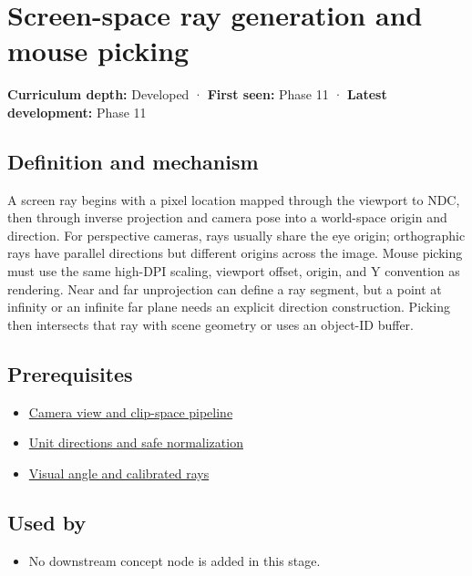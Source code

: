 \hypertarget{appendix-f1a6d43e80d1}{}\label{referencestart:appendix-f1a6d43e80d1}
\section{Screen-space ray generation and mouse picking}\label{appendix-f1a6d43e80d1-screen-space-ray-generation-and-mouse-picking}

\textbf{Curriculum depth:} Developed · \textbf{First seen:} Phase 11 · \textbf{Latest development:} Phase 11

\subsection{Definition and mechanism}\label{appendix-f1a6d43e80d1-definition-and-mechanism}

A screen ray begins with a pixel location mapped through the viewport to NDC, then through inverse projection and camera pose into a world-space origin and direction. For perspective cameras, rays usually share the eye origin; orthographic rays have parallel directions but different origins across the image. Mouse picking must use the same high-DPI scaling, viewport offset, origin, and Y convention as rendering. Near and far unprojection can define a ray segment, but a point at infinity or an infinite far plane needs an explicit direction construction. Picking then intersects that ray with scene geometry or uses an object-ID buffer.

\subsection{Prerequisites}\label{appendix-f1a6d43e80d1-prerequisites}

\begin{itemize}
\tightlist
\item
  \hyperref[appendix-1c07d64f5e70]{Camera view and clip-space pipeline}
\item
  \hyperref[appendix-f744e41b95b4]{Unit directions and safe normalization}
\item
  \hyperref[appendix-7d356c396d1a]{Visual angle and calibrated rays}
\end{itemize}

\subsection{Used by}\label{appendix-f1a6d43e80d1-used-by}

\begin{itemize}
\tightlist
\item
  No downstream concept node is added in this stage.
\end{itemize}

